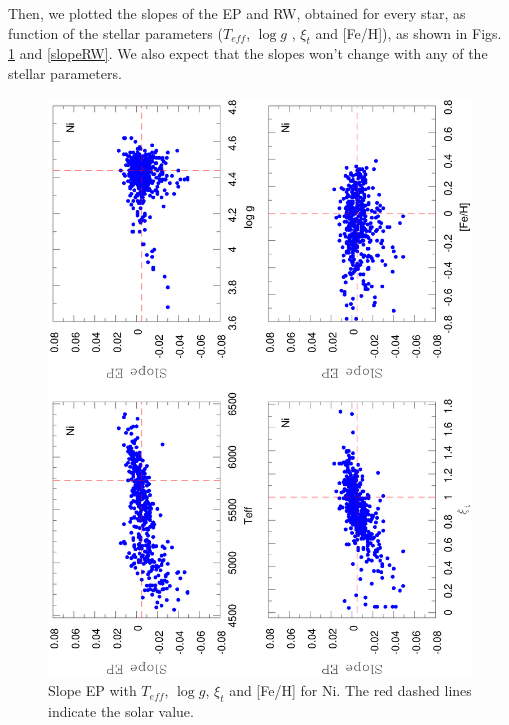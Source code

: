 \documentclass[dvips,12pt,a4paper]{report}
\begin{document}
{{Then, we plotted the slopes of the EP and RW, obtained for every star, as function of the stellar parameters ($T_{eff}$, $\log g$ , $\xi_t$ and [Fe/H]), as shown in Figs. \ref{slopeEP} and \ref{slopeRW}. We also expect that the slopes won't change with any of the stellar parameters.

\begin{figure}[h!]
\centering
\includegraphics[angle=-90, trim=8mm 10mm 5mm 10mm, clip,width=12 cm]{pics/parte3/EP.eps}
\caption[Slope EP with Teff, log $g$, $\xi$t and metallicity for Ni]{Slope EP with $T_{eff}$, $\log g$, $\xi_t$ and [Fe/H] for Ni. The red dashed lines indicate the solar value.}
\label{slopeEP}
\end{figure}

}}
\end{document}
